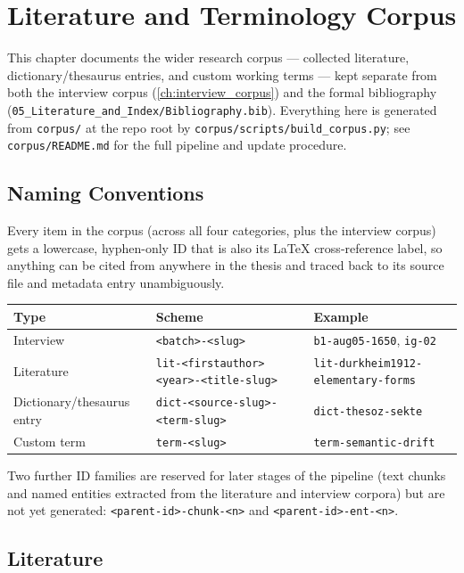 \chapter{Literature and Terminology Corpus}\label{ch:literature_corpus}

This chapter documents the wider research corpus — collected literature,
dictionary/thesaurus entries, and custom working terms — kept separate from
both the interview corpus (\ref{ch:interview_corpus}) and the formal
bibliography (\texttt{05\_Literature\_and\_Index/Bibliography.bib}). Everything
here is generated from \texttt{corpus/} at the repo root by
\texttt{corpus/scripts/build\_corpus.py}; see \texttt{corpus/README.md} for the
full pipeline and update procedure.

\section{Naming Conventions}

Every item in the corpus (across all four categories, plus the interview
corpus) gets a lowercase, hyphen-only ID that is also its LaTeX cross-reference
label, so anything can be cited from anywhere in the thesis and traced back to
its source file and metadata entry unambiguously.

\begin{center}
\begin{tabular}{@{}lll@{}}
\toprule
Type & Scheme & Example \\
\midrule
Interview & \texttt{<batch>-<slug>} & \texttt{b1-aug05-1650}, \texttt{ig-02} \\
Literature & \texttt{lit-<firstauthor><year>-<title-slug>} & \texttt{lit-durkheim1912-elementary-forms} \\
Dictionary/thesaurus entry & \texttt{dict-<source-slug>-<term-slug>} & \texttt{dict-thesoz-sekte} \\
Custom term & \texttt{term-<slug>} & \texttt{term-semantic-drift} \\
\bottomrule
\end{tabular}
\end{center}

Two further ID families are reserved for later stages of the pipeline (text
chunks and named entities extracted from the literature and interview corpora)
but are not yet generated: \texttt{<parent-id>-chunk-<n>} and
\texttt{<parent-id>-ent-<n>}.

\section{Literature}


